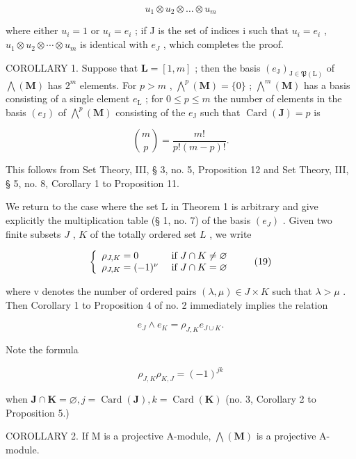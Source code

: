 \[
u _ {1} \otimes u _ {2} \otimes \dots \otimes u _ {m}
\]

where either \(u_{i}=1\) or \(u_{i}=e_{i}\) ; if J is the set of indices i such that \(u_{i}=e_{i}\) , \(u_{1}\otimes u_{2}\otimes\cdots\otimes u_{m}\) is identical with \(e_{J}\) , which completes the proof.

COROLLARY 1. Suppose that \(\mathbf{L} = [1, m]\) ; then the basis \((e_{\mathrm{J}})_{\mathrm{J} \in \mathfrak{P}(\mathrm{L})}\) of \(\bigwedge (\mathbf{M})\) has \(2^{m}\) elements. For \(p > m\) , \(\bigwedge^{p}(\mathbf{M}) = \{0\}\) ; \(\bigwedge^{m}(\mathbf{M})\) has a basis consisting of a single element \(e_{\mathrm{L}}\) ; for \(0 \leqslant p \leqslant m\) the number of elements in the basis \((e_{\mathrm{J}})\) of \(\bigwedge^{p}(\mathbf{M})\) consisting of the \(e_{\mathrm{J}}\) such that \(\operatorname{Card}(\mathbf{J}) = p\) is

\[
\binom {m} {p} = \frac {m !}{p ! (m - p) !}.
\]

This follows from Set Theory, III, § 3, no. 5, Proposition 12 and Set Theory, III, § 5, no. 8, Corollary 1 to Proposition 11.

We return to the case where the set L in Theorem 1 is arbitrary and give explicitly the multiplication table (§ 1, no. 7) of the basis \((e_{J})\) . Given two finite subsets \(J\) , \(K\) of the totally ordered set \(L\) , we write

\[
\left\{ \begin{array}{l l} \rho_ {J, K} = 0 & \text { if } J \cap K \neq \varnothing \\ \rho_ {J, K} = (- 1) ^ {\nu} & \text { if } J \cap K = \varnothing \end{array} \right.\tag{19}
\]

where v denotes the number of ordered pairs \((\lambda, \mu) \in J \times K\) such that \(\lambda > \mu\) . Then Corollary 1 to Proposition 4 of no. 2 immediately implies the relation

\[
e _ {J} \wedge e _ {K} = \rho_ {J, K} e _ {J \cup K}.\tag{20}
\]

Note the formula

\[
\rho_ {J, K} \rho_ {K, J} = (- 1) ^ {j k}\tag{21}
\]

when \(\mathbf{J} \cap \mathbf{K} = \varnothing, j = \operatorname{Card}(\mathbf{J}), k = \operatorname{Card}(\mathbf{K})\) (no. 3, Corollary 2 to Proposition 5.)

COROLLARY 2. If M is a projective A-module, \(\bigwedge (\mathbf{M})\) is a projective A-module.

